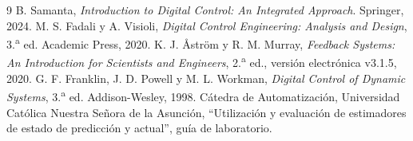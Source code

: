 \begin{thebibliography}{9}
 B. Samanta, \emph{Introduction to Digital Control: An Integrated Approach}. Springer, 2024.
 M. S. Fadali y A. Visioli, \emph{Digital Control Engineering: Analysis and Design}, 3.\textsuperscript{a} ed. Academic Press, 2020.
 K. J. Åstr\"om y R. M. Murray, \emph{Feedback Systems: An Introduction for Scientists and Engineers}, 2.\textsuperscript{a} ed., versión electrónica v3.1.5, 2020.
 G. F. Franklin, J. D. Powell y M. L. Workman, \emph{Digital Control of Dynamic Systems}, 3.\textsuperscript{a} ed. Addison-Wesley, 1998.
 Cátedra de Automatización, Universidad Católica Nuestra Señora de la Asunción, ``Utilización y evaluación de estimadores de estado de predicción y actual'', guía de laboratorio.
\end{thebibliography}
